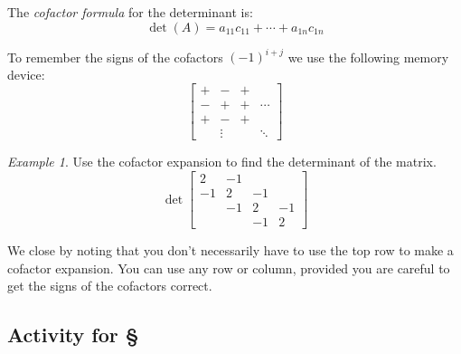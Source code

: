 \documentclass[11pt,oneside]{amsbook}
\theoremstyle{definition}
\theoremstyle{plain}
\theoremstyle{definition}
\theoremstyle{remark}
\newtheorem{example}[theorem]{Example}
\numberwithin{equation}{section}
\numberwithin{figure}{section}
\begin{document}
The \emph{cofactor formula} for the determinant is:
\[\det(A)=a_{11}c_{11}+\cdots+a_{1n}c_{1n}
\]

To remember the signs of the cofactors $(-1)^{i+j}$ we use the following memory device:
\[\begin{bmatrix}
    +&-&+\\-&+&+&\cdots\\+&-&+\\&\vdots&&\ddots
  \end{bmatrix}
\]

\begin{example}
  Use the cofactor expansion to find the determinant of the matrix.
  \[\det\begin{bmatrix}
    2&-1\\-1&2&-1\\&-1&2&-1\\&&-1&2
  \end{bmatrix}
  \]
\end{example}

We close by noting that you don't necessarily have to use the top row to make a cofactor expansion. You can use any row or column, provided you are careful to get the signs of the cofactors correct.

\newpage
\subsection*{Activity for \S \thesection}
\end{document}
